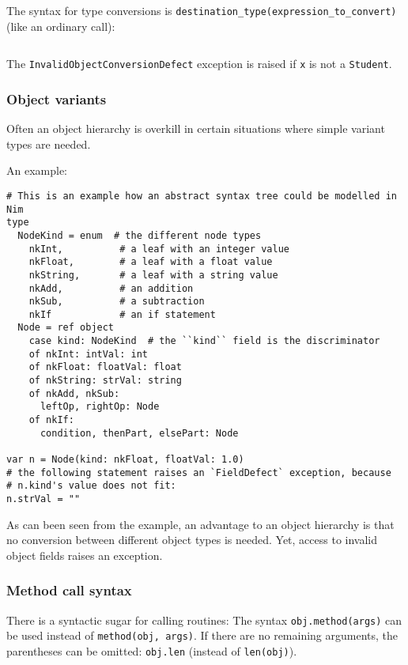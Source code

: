 The syntax for type conversions is
\texttt{destination\_type(expression\_to\_convert)} (like an ordinary
call):

\begin{verbatim}
\end{verbatim}

The \texttt{InvalidObjectConversionDefect} exception is raised if
\texttt{x} is not a \texttt{Student}.

\hypertarget{object-variants}{%
\subsubsection{Object variants}\label{object-variants}}

Often an object hierarchy is overkill in certain situations where simple
variant types are needed.

An example:

\begin{verbatim}
# This is an example how an abstract syntax tree could be modelled in Nim
type
  NodeKind = enum  # the different node types
    nkInt,          # a leaf with an integer value
    nkFloat,        # a leaf with a float value
    nkString,       # a leaf with a string value
    nkAdd,          # an addition
    nkSub,          # a subtraction
    nkIf            # an if statement
  Node = ref object
    case kind: NodeKind  # the ``kind`` field is the discriminator
    of nkInt: intVal: int
    of nkFloat: floatVal: float
    of nkString: strVal: string
    of nkAdd, nkSub:
      leftOp, rightOp: Node
    of nkIf:
      condition, thenPart, elsePart: Node

var n = Node(kind: nkFloat, floatVal: 1.0)
# the following statement raises an `FieldDefect` exception, because
# n.kind's value does not fit:
n.strVal = ""
\end{verbatim}

As can been seen from the example, an advantage to an object hierarchy
is that no conversion between different object types is needed. Yet,
access to invalid object fields raises an exception.

\hypertarget{method-call-syntax}{%
\subsubsection{Method call syntax}\label{method-call-syntax}}

There is a syntactic sugar for calling routines: The syntax
\texttt{obj.method(args)} can be used instead of
\texttt{method(obj,\ args)}. If there are no remaining arguments, the
parentheses can be omitted: \texttt{obj.len} (instead of
\texttt{len(obj)}).

